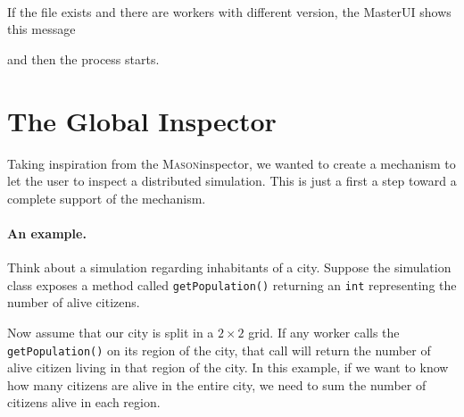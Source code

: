 \documentclass{article}
\def\ma{\textsc{Mason}}
\begin{document}
\begin{figure}[h]
\end{figure}\\
If the file exists and there are workers with different
version, the MasterUI shows this message
\begin{figure}[h!]
\end{figure}
and then the process starts.

\newpage
\section{The Global Inspector}

Taking inspiration from the \ma inspector, we wanted to create a mechanism to let the user to inspect a distributed simulation. This is just a first a step toward a complete support of the mechanism.

\paragraph*{An example.}
Think about a simulation regarding inhabitants of a city. Suppose the simulation class exposes a method called \texttt{getPopulation()} returning an \texttt{int} representing the number of alive citizens.

Now assume that our city is split in a $2\times2$ grid. If any worker calls the \texttt{getPopulation()} on its region of the city, that call will return the number of alive citizen living in that region of the city. In this example, if we want to know how many citizens are alive in the entire city, we need to sum the number of citizens alive in each region.
\end{document}
